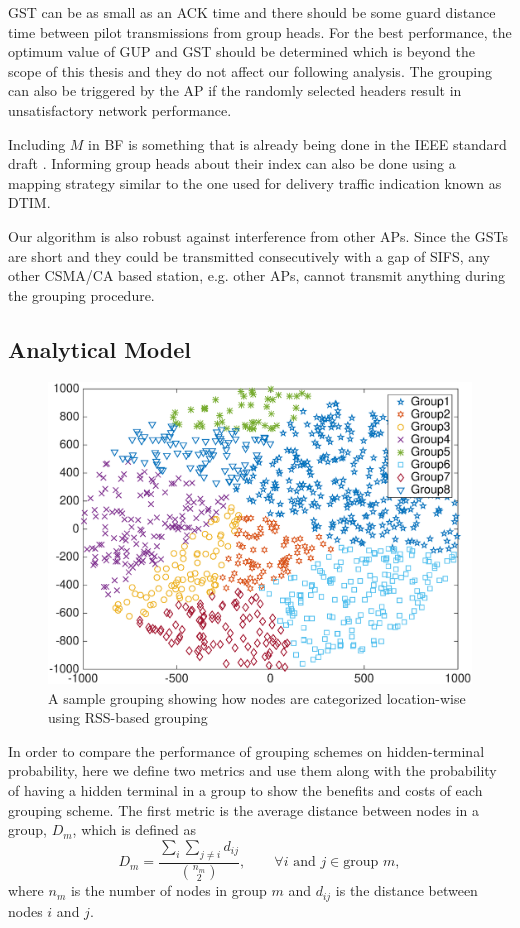 GST can be as small as an ACK time and there should be some guard distance time between pilot transmissions from group heads. For the best performance, the optimum value of GUP and GST should be determined which is beyond the scope of this thesis and they do not affect our following analysis. The grouping can also be triggered by the AP if the randomly selected headers result in unsatisfactory network performance.

Including $M$ in BF is something that is already being done in the IEEE standard draft \cite{Draft80211ah}. Informing group heads about their index can also be done using a mapping strategy similar to the one used for delivery traffic indication known as DTIM.

Our algorithm is also robust against interference from other APs. Since the GSTs are short and they could be transmitted consecutively with a gap of SIFS, any other CSMA/CA based station, e.g. other APs, cannot transmit anything during the grouping procedure.

\subsection{Analytical Model}

\begin{figure}
  \centering
  \includegraphics[width=.95\textwidth]{figures/sample_vonoroli}
  \caption{A sample grouping showing how nodes are categorized location-wise using RSS-based grouping}
  \label{fig:samplevonoroli}
\end{figure}

In order to compare the performance of grouping schemes on hidden-terminal probability, here we define two metrics and use them along with the probability of having a hidden terminal in a group to show the benefits and costs of each grouping scheme. The first metric is the average distance between nodes in a group, $D_m$, which is defined as
\begin{equation}
D_m=\frac{\sum_{i} \sum_{j \neq i} d_{ij}}{{n_m \choose 2}},  \quad \quad \forall i \text{ and } j \in \text{group $m$},
\end{equation}
where $n_m$ is the number of nodes in group $m$ and $d_{ij}$ is the distance between nodes $i$ and $j$.

